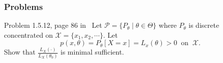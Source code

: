 \documentclass[serif,mathserif,professionalfont]{beamer}
\begin{document}
\begin{frame}
	
	\frametitle{Problems}
	
	\begin{block}{Problem 1.5.12, page 86 in~\cite{BD2015}}
		Let $ \mathcal{P} = \{P_{\theta} \; | \; \theta \in \Theta \} $ where $ P_{\theta} $ is discrete concentrated on $ \mathcal{X} = \{x_1, x_2, \cdots \} $. Let
		\begin{equation*}
		p\left(x, \theta \right) = P_{\theta}\left[X = x \right] = L_x\left(\theta \right) > 0 \;\; \text{on} \;\; \mathcal{X}.
		\end{equation*}
		Show that $ \frac{L_X\left(\cdot \right)}{L_X\left(\theta_0 \right)} $ is minimal sufficient.
	\end{block}
	
	
\end{frame}











%
%	
%	
%    
%    	
%      
%    	
%    	
%    	
%    	
%    	
%    	
%
%
\end{document}
